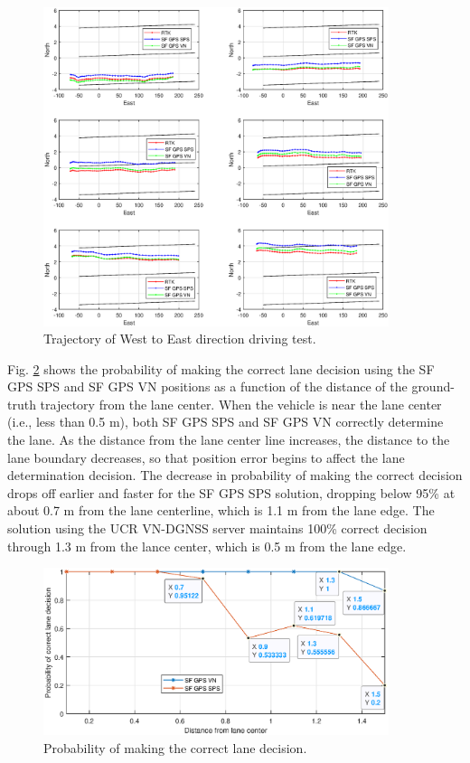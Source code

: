 \documentclass[letterpaper, 10 pt,onecolumn]{article}
\begin{document}
	\begin{figure}[H]		
		\centering		
		\includegraphics[width=0.9\textwidth]{figures/w2e.eps}	
		\caption{Trajectory of West to East direction driving test.}		
		\label{fig:w2e}	
	\end{figure}
	
	Fig. \ref{fig:probLD} shows the probability of making the correct lane decision using the SF GPS SPS and SF GPS VN positions as a function of the distance of the ground-truth trajectory from the lane center. When the vehicle is near the lane center (i.e., less than 0.5 m), both SF GPS SPS and SF GPS VN correctly determine the lane. As the distance from the lane center line increases, the distance to the lane boundary decreases, so that position error begins to affect the lane determination decision. The decrease in probability of making the correct decision drops off earlier and faster for the SF GPS SPS solution, dropping below 95\% at about 0.7 m from the lane centerline, which is 1.1 m from the lane edge. The solution using the UCR VN-DGNSS server maintains 100\% correct decision through 1.3 m from the lance center, which is 0.5 m from the lane edge.
	\begin{figure}[H]		
		\centering		
		\includegraphics[width=0.9\textwidth]{figures/probLD.eps}	
		\caption{Probability of making the correct lane decision.}		
		\label{fig:probLD}	
	\end{figure}

	
	
	
\end{document}
